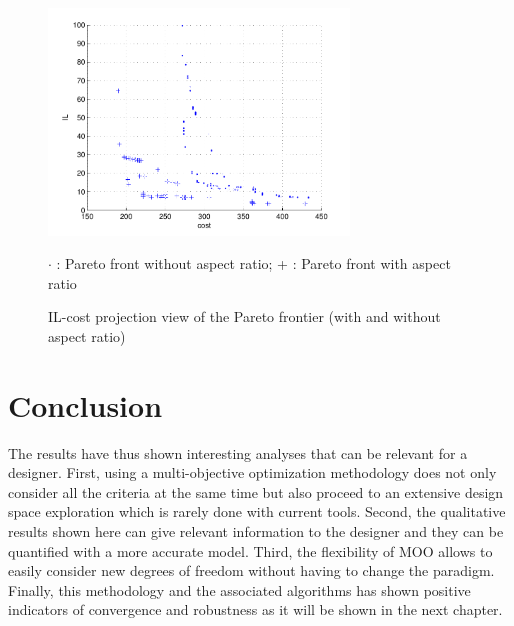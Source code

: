 \begin{figure}[h!]
\begin{center}
\includegraphics[width=8cm]{ultiplot_ff.pdf}
\end{center}
\vspace{-0.5cm}
\caption{IL-cost projection view of the Pareto frontier (with and without aspect ratio)}
\begin{center}
\begin{scriptsize}
$\cdot$ : Pareto front without aspect ratio; + : Pareto front with aspect ratio\\
\end{scriptsize}
\end{center}
\label{fig:ilcview_ff}
\end{figure}

\section{Conclusion}

The results have thus shown interesting analyses that can be relevant for a designer. First, using a multi-objective optimization methodology does not only consider all the criteria at the same time but also proceed to an extensive design space exploration which is rarely done with current tools. Second, the qualitative results shown here can give relevant information to the designer and they can be quantified with a more accurate model. Third, the flexibility of MOO allows to easily consider new degrees of freedom without having to change the paradigm. Finally, this methodology and the associated algorithms has shown positive indicators of convergence and robustness as it will be shown in the next chapter.
